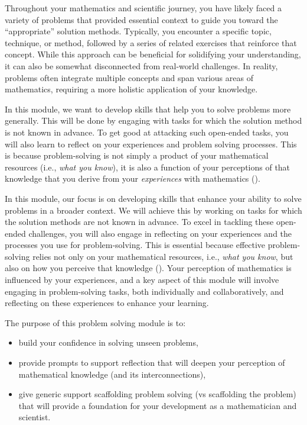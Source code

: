 \documentclass[
  a4paper,
  DIV=11,
  numbers=noendperiod,
  oneside]{scrreprt}
\providecommand{\tightlist}{%
  \setlength{\itemsep}{0pt}\setlength{\parskip}{0pt}}
\begin{document}
Throughout your mathematics and scientific journey, you have likely
faced a variety of problems that provided essential context to guide you
toward the ``appropriate'' solution methods. Typically, you encounter a
specific topic, technique, or method, followed by a series of related
exercises that reinforce that concept. While this approach can be
beneficial for solidifying your understanding, it can also be somewhat
disconnected from real-world challenges. In reality, problems often
integrate multiple concepts and span various areas of mathematics,
requiring a more holistic application of your knowledge.

In this module, we want to develop skills that help you to solve
problems more generally. This will be done by engaging with tasks for
which the solution method is not known in advance. To get good at
attacking such open-ended tasks, you will also learn to reflect on your
experiences and problem solving processes. This is because
problem-solving is not simply a product of your mathematical resources
(i.e., \emph{what you know}), it is also a function of your perceptions
of that knowledge that you derive from your \emph{experiences} with
mathematics ().

In this module, our focus is on developing skills that enhance your
ability to solve problems in a broader context. We will achieve this by
working on tasks for which the solution methods are not known in
advance. To excel in tackling these open-ended challenges, you will also
engage in reflecting on your experiences and the processes you use for
problem-solving. This is essential because effective problem-solving
relies not only on your mathematical resources, i.e., \emph{what you
know}, but also on how you perceive that knowledge
(). Your perception of
mathematics is influenced by your experiences, and a key aspect of this
module will involve engaging in problem-solving tasks, both individually
and collaboratively, and reflecting on these experiences to enhance your
learning.

The purpose of this problem solving module is to:

\begin{itemize}
\tightlist
\item
  build your confidence in solving unseen problems,
\item
  provide prompts to support reflection that will deepen your perception
  of mathematical knowledge (and its interconnections),
\item
  give generic support scaffolding problem solving (vs scaffolding the
  problem) that will provide a foundation for your development as a
  mathematician and scientist.
\end{itemize}
\end{document}
